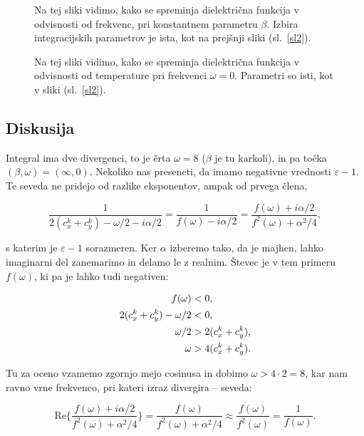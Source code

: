 \documentclass[a4paper, 12pt]{article}
\newcommand{\w}{
	\ensuremath{\omega}
}
\renewcommand{\ni}{
	\noindent
}
\begin{document}
\begin{figure}[H]
	\centering
	
	\caption{Na tej sliki vidimo, kako se spreminja dielektri\v cna funkcija v odvisnosti
		od frekvenc, pri konstantnem parametru $\beta$. Izbira integracijskih parametrov je ista, kot
		na prej\v snji sliki (sl.~\ref{sl2}).}
	\label{sl1}
\end{figure}

\begin{figure}[H]
	\centering
	
	\caption{Na tej sliki vidimo, kako se spreminja dielektri\v cna funkcija v odvisnosti
		od temperature pri frekvenci $\w = 0$. Parametri so isti, kot
		v sliki (sl.~\ref{sl2}).}
	\label{sl3}
\end{figure}

\subsection{Diskusija}

Integral ima dve divergenci, to je \v crta $\w = 8$ ($\beta$ je tu karkoli), in pa to\v cka $(\beta, \w) = (\infty, 0)$. 
Nekoliko nas preseneti, da imamo negativne vrednosti $\varepsilon -1$. Te seveda ne pridejo od razlike eksponentov, ampak
od prvega \v clena,

\begin{equation}
	\frac{1}{2(c_x^k + c_y^k) - \w/2 - i\alpha/2} = \frac{1}{f(\w) - i\alpha/2} = \frac{f(\w) + i\alpha/2}{f^2(\w)
		+ \alpha^2/4},
\end{equation}

\ni s katerim je $\varepsilon - 1$ sorazmeren. Ker $\alpha$ izberemo tako, da je majhen, lahko imaginarni del zanemarimo in
delamo le z realnim. \v Stevec je v tem primeru $f(\w)$, ki pa je lahko tudi negativen:

\begin{align}
	f(\w) &< 0, \notag \\
	2(c_x^k + c_y^k) - \w/2 &< 0, \notag \\
	\w/2 &> 2(c_x^k + c_y^k), \notag \\
	\w &> 4 (c_x^k + c_y^k).
\end{align}

\ni Tu za oceno vzamemo zgornjo mejo cosinusa in dobimo $\w > 4 \cdot 2 = 8$, kar nam ravno vrne frekvenco, pri kateri izraz
divergira -- seveda:

\begin{equation}
	\text{Re}\bigg\{\frac{f(\w) + i\alpha/2}{f^2(\w) + \alpha^2/4}\bigg\} = \frac{f(\w)}{f^2(\w) + \alpha^2/4}
		\approx \frac{f(\w)}{f^2(\w)} = \frac{1}{f(\w)}.
\end{equation}
\end{document}
